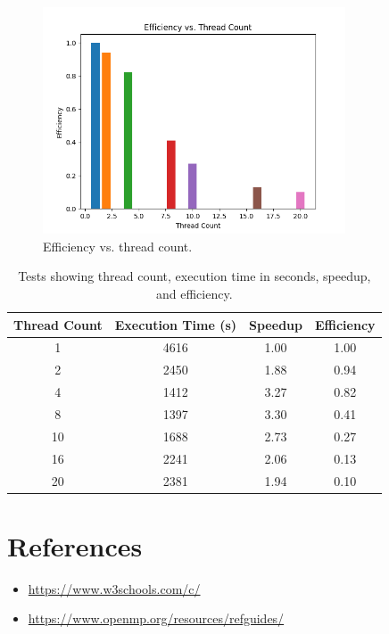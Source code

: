\documentclass{article}
\begin{document}
	\begin{figure}[ht]
		\centering
		\includegraphics[width=0.8\textwidth]{Figure_2}
		\caption{Efficiency vs. thread count.}
		\label{figure2}
	\end{figure}
	
	\begin{table}
		\centering
		\begin{tabular}{|c|c|c|c|}
			\hline
			\textbf{Thread Count} & \textbf{Execution Time (s)} & \textbf{Speedup} & \textbf{Efficiency} \\
			\hline
			1  & 4616 & 1.00 & 1.00 \\
			2  & 2450 & 1.88 & 0.94 \\
			4  & 1412 & 3.27 & 0.82 \\
			8  & 1397 & 3.30 & 0.41 \\
			10 & 1688 & 2.73 & 0.27 \\
			16 & 2241 & 2.06 & 0.13 \\
			20 & 2381 & 1.94 & 0.10 \\
			\hline
		\end{tabular}
		\caption{Tests showing thread count, execution time in seconds, speedup, and efficiency.}
		\label{table1}
	\end{table}
	
	\clearpage
	
	\section{References}
	\begin{itemize}
		\item \href{https://www.w3schools.com/c/}{https://www.w3schools.com/c/}
		\item \href{https://www.openmp.org/resources/refguides/}{https://www.openmp.org/resources/refguides/}
	\end{itemize}
	
\end{document}
